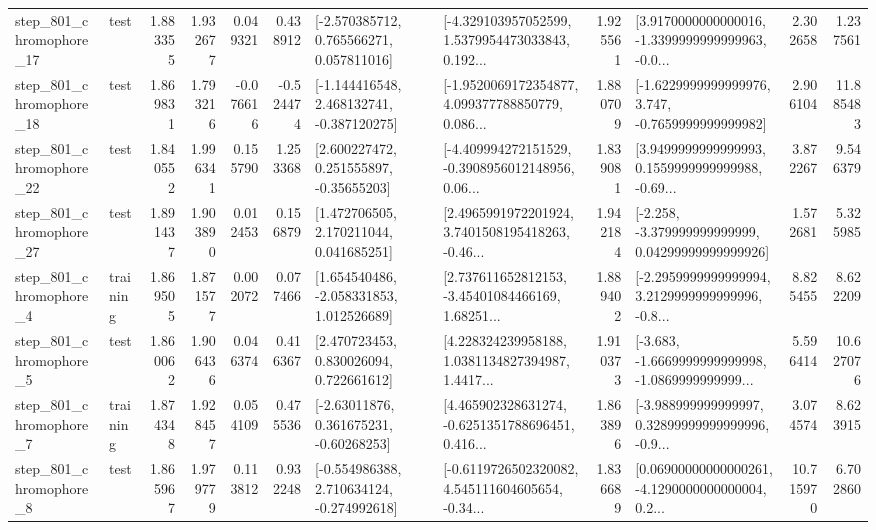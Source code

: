\begin{tabular}{llrrrrllrlrr}
  step\_801\_chromophore\_17 &      test &      1.883355 &    1.932677 &      0.049321 &  0.438912 &    [-2.570385712, 0.765566271, 0.057811016] &  [-4.329103957052599, 1.5379954473033843, 0.192... &       1.925561 &  [3.9170000000000016, -1.3399999999999963, -0.0... &            2.302658 &          1.237561 \\
  step\_801\_chromophore\_18 &      test &      1.869831 &    1.793216 &     -0.076616 & -0.524474 &   [-1.144416548, 2.468132741, -0.387120275] &  [-1.9520069172354877, 4.099377788850779, 0.086... &       1.880709 &  [-1.6229999999999976, 3.747, -0.7659999999999982] &            2.906104 &         11.885483 \\
  step\_801\_chromophore\_22 &      test &      1.840552 &    1.996341 &      0.155790 &  1.253368 &     [2.600227472, 0.251555897, -0.35655203] &  [-4.409994272151529, -0.3908956012148956, 0.06... &       1.839081 &  [3.9499999999999993, 0.1559999999999988, -0.69... &            3.872267 &          9.546379 \\
  step\_801\_chromophore\_27 &      test &      1.891437 &    1.903890 &      0.012453 &  0.156879 &     [1.472706505, 2.170211044, 0.041685251] &  [2.4965991972201924, 3.7401508195418263, -0.46... &       1.942184 &  [-2.258, -3.379999999999999, 0.04299999999999926] &            1.572681 &          5.325985 \\
   step\_801\_chromophore\_4 &  training &      1.869505 &    1.871577 &      0.002072 &  0.077466 &    [1.654540486, -2.058331853, 1.012526689] &  [2.737611652812153, -3.45401084466169, 1.68251... &       1.889402 &  [-2.2959999999999994, 3.2129999999999996, -0.8... &            8.825455 &          8.622209 \\
   step\_801\_chromophore\_5 &      test &      1.860062 &    1.906436 &      0.046374 &  0.416367 &     [2.470723453, 0.830026094, 0.722661612] &  [4.228324239958188, 1.0381134827394987, 1.4417... &       1.910373 &  [-3.683, -1.6669999999999998, -1.0869999999999... &            5.596414 &         10.627076 \\
   step\_801\_chromophore\_7 &  training &      1.874348 &    1.928457 &      0.054109 &  0.475536 &     [-2.63011876, 0.361675231, -0.60268253] &  [4.465902328631274, -0.6251351788696451, 0.416... &       1.863896 &  [-3.988999999999997, 0.32899999999999996, -0.9... &            3.074574 &          8.623915 \\
   step\_801\_chromophore\_8 &      test &      1.865967 &    1.979779 &      0.113812 &  0.932248 &   [-0.554986388, 2.710634124, -0.274992618] &  [-0.6119726502320082, 4.545111604605654, -0.34... &       1.836689 &  [0.06900000000000261, -4.1290000000000004, 0.2... &           10.715970 &          6.702860 \\

\end{tabular}
